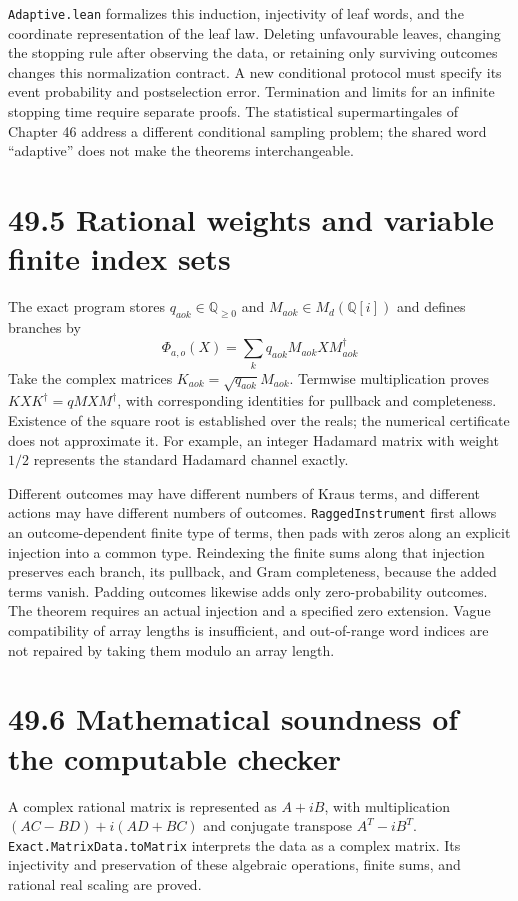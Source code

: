 \documentclass[
  11pt,
  oneside]{book}
\begin{document}
\texttt{Adaptive.\allowbreak lean} formalizes this induction, injectivity of leaf
words, and the coordinate representation of the leaf law. Deleting
unfavourable leaves, changing the stopping rule after observing the
data, or retaining only surviving outcomes changes this normalization
contract. A new conditional protocol must specify its event probability
and postselection error. Termination and limits for an infinite stopping
time require separate proofs. The statistical supermartingales of
Chapter 46 address a different conditional sampling problem; the shared
word ``adaptive'' does not make the theorems interchangeable.

\section{49.5 Rational weights and variable finite index sets}

The exact program stores \(q_{aok}\in\mathbb Q_{\ge0}\) and
\(M_{aok}\in M_d(\mathbb Q[i])\) and defines branches by \[
\Phi_{a,o}(X)=\sum_kq_{aok}M_{aok}XM_{aok}^{\dagger}
\] Take the complex matrices \(K_{aok}=\sqrt{q_{aok}}M_{aok}\). Termwise
multiplication proves \(KXK^\dagger=qMXM^\dagger\), with corresponding
identities for pullback and completeness. Existence of the square root
is established over the reals; the numerical certificate does not
approximate it. For example, an integer Hadamard matrix with weight
\(1/2\) represents the standard Hadamard channel exactly.

Different outcomes may have different numbers of Kraus terms, and
different actions may have different numbers of outcomes.
\texttt{Ragged\allowbreak Instrument} first allows an outcome-dependent finite type
of terms, then pads with zeros along an explicit injection into a common
type. Reindexing the finite sums along that injection preserves each
branch, its pullback, and Gram completeness, because the added terms
vanish. Padding outcomes likewise adds only zero-probability outcomes.
The theorem requires an actual injection and a specified zero extension.
Vague compatibility of array lengths is insufficient, and out-of-range
word indices are not repaired by taking them modulo an array length.

\section{49.6 Mathematical soundness of the computable checker}

A complex rational matrix is represented as \(A+iB\), with
multiplication \((AC-BD)+i(AD+BC)\) and conjugate transpose
\(A^T-iB^T\). \texttt{Exact.\allowbreak Matrix\allowbreak Data.\allowbreak to\allowbreak Matrix} interprets the data as
a complex matrix. Its injectivity and preservation of these algebraic
operations, finite sums, and rational real scaling are proved.
\end{document}
